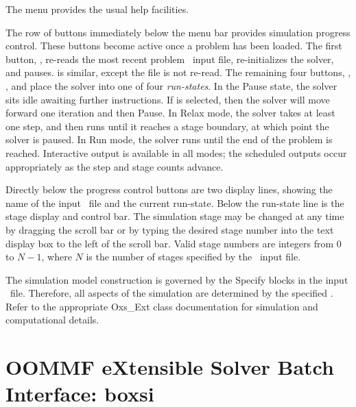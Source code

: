 The  menu provides the usual help facilities.

The row of buttons immediately below the menu bar provides simulation
progress control.  These buttons become active once a problem has
been loaded.  The first button, , re-reads the most recent
problem \MIF\ input file, re-initializes the solver, and pauses.
 is similar, except the file is not re-read.  The remaining
four buttons, ,
,  and  place the solver into one of
four \textit{run-states}.  In the Pause state, the solver sits idle
awaiting further instructions.  If  is selected, then the
solver will move forward one iteration and then Pause.  In Relax mode,
the solver takes at least one step, and then runs until it reaches a
stage boundary, at which point the solver is paused.  In Run mode, the
solver runs until the end of the problem is reached.  Interactive output
is available in all modes; the scheduled outputs occur appropriately as
the step and stage counts advance.

Directly below the progress control buttons are two display lines,
showing the name of the input \MIF\ file and the current run-state.
Below the run-state  line is the stage display and control
bar.  The simulation stage may be changed at any time by dragging the
scroll bar or by typing the desired stage number into the text display
box to the left of the scroll bar.  Valid stage numbers are integers
from 0 to $N-1$, where $N$ is the number of stages specified by the
\MIF\ input file.

The simulation model construction is governed by the Specify blocks in
the input \MIF\ file.  Therefore, all aspects of the simulation are
determined by the specified
.
Refer to the appropriate Oxs\_Ext class documentation for simulation and
computational details.


\section{OOMMF eXtensible Solver Batch Interface: boxsi}\label{sec:boxsi}%

\begin{center}
\end{center}

